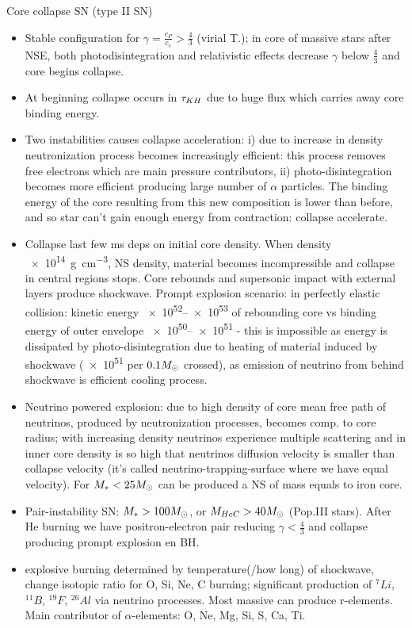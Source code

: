 \begin{frame}{Core collapse SN (type II SN)}
    \begin{itemize}
        \item Stable configuration for $\gamma=\frac{c_P}{c_v}>\frac{4}{3}$ (virial T.); in core of massive stars after NSE, both photodisintegration and relativistic effects decrease $\gamma$ below $\frac{4}{3}$ and core begins collapse.
        \item At beginning collapse occurs in $\tau_{KH}{}$ due to huge \Pnu flux which carries away core binding energy.
    \item Two instabilities causes collapse acceleration: i) due to increase in density neutronization process becomes increasingly efficient: this process removes free electrons which are main pressure contributors, ii) photo-disintegration becomes more efficient producing large number of $\alpha$ particles. The binding energy of the core resulting from this new composition is lower than before, and so star can't gain enough energy from contraction: collapse accelerate.
\item Collapse last few ms deps on initial core density. When density \SI{e14}{\gram\per\cubic\cm}, NS density, material becomes incompressible and collapse in central regions stops. Core rebounds and supersonic impact with external layers produce shockwave. Prompt explosion scenario: in perfectly elastic collision: kinetic energy \SIrange{e52}{e53}{\erg} of rebounding core vs binding energy of outer envelope \SIrange{e50}{e51}{\erg} - this is impossible as energy is dissipated by photo-disintegration due to heating of material induced by shockwave (\SI{e51}{\erg} per $0.1M_{\odot}$ crossed), as emission of neutrino from behind shockwave is efficient cooling process.
\item Neutrino powered explosion: due to high density of core mean free path of neutrinos, produced by neutronization processes, becomes comp. to core radius; with increasing density neutrinos experience multiple scattering and in inner core density is so high that neutrinos diffusion velocity is smaller than collapse velocity (it's called neutrino-trapping-surface where we have equal velocity). For $M_*<25M_{\odot}{}$ can be produced a NS of mass equals to iron core.
\item Pair-instability SN: $M_*>100M_{\odot}{}$, or $M_{HeC}>40M_{\odot}{}$ (Pop.III stars). After He burning we have positron-electron pair reducing $\gamma<\frac{4}{3}$ and collapse producing prompt explosion en BH.
\item explosive burning determined by temperature(/how long) of shockwave, change isotopic ratio for O, Si, Ne, C burning; significant production of $^7Li$, $^{11}B$, $^{19}F$, $^{26}Al$ via neutrino processes. Most massive can produce r-elements. Main contributor of $\alpha$-elements: O, Ne, Mg, Si, S, Ca, Ti. 
    \end{itemize}
\end{frame}

